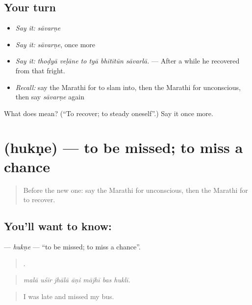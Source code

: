 \subsection*{Your turn}
\begin{itemize}
\raggedright
  \item \emph{Say it:} \emph{sāvarṇe}
  \item \emph{Say it:} \emph{sāvarṇe}, once more
  \item \emph{Say it:} \emph{thoḍyā veḷāne to tyā bhītītūn sāvarlā.} — After a while he recovered from that fright.
  \item \emph{Recall:} say the Marathi for to slam into, then the Marathi for unconscious, then say \emph{sāvarṇe} again
\end{itemize}

\begin{tcolorbox}[breakable,colback=teal!4,colframe=teal!35!black,title={Before you move on}]
What does  mean? (\textquotedblleft{}To recover; to steady oneself\textquotedblright{}.) Say it once more.
\end{tcolorbox}
\section[\texorpdfstring{\mr{हुकणे} (hukṇe)}{हुकणे (hukṇe)}]{ (hukṇe) — to be missed; to miss a chance}

\label{lesson:MR-C296-hukne}



\begin{quote}
Before the new one: say the Marathi for unconscious, then the Marathi for to recover.
\end{quote}

\subsection*{You'll want to know: }
\textbf{} — \emph{hukṇe} — \textquotedblleft{}to be missed; to miss a chance\textquotedblright{}.

\begin{quote}
      .
\end{quote}

\begin{quote}
\emph{malā uśīr jhālā āṇi mājhī bas huklī.}
\end{quote}

\begin{quote}
I was late and missed my bus.
\end{quote}

